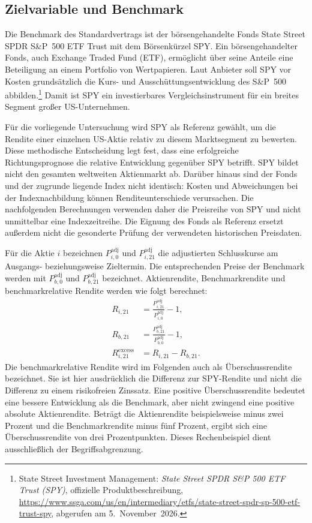 \subsection{Zielvariable und Benchmark}
Die Benchmark des Standardvertrags ist der börsengehandelte Fonds State Street SPDR S\&P~500 ETF Trust mit dem Börsenkürzel SPY. Ein börsengehandelter Fonds, auch Exchange Traded Fund (ETF), ermöglicht über seine Anteile eine Beteiligung an einem Portfolio von Wertpapieren. Laut Anbieter soll SPY vor Kosten grundsätzlich die Kurs- und Ausschüttungsentwicklung des S\&P~500 abbilden.\footnote{State Street Investment Management: \emph{State Street SPDR S\&P 500 ETF Trust (SPY)}, offizielle Produktbeschreibung, \url{https://www.ssga.com/us/en/intermediary/etfs/state-street-spdr-sp-500-etf-trust-spy}, abgerufen am 5.~November~2026.} Damit ist SPY ein investierbares Vergleichsinstrument für ein breites Segment großer US-Unternehmen.

Für die vorliegende Untersuchung wird SPY als Referenz gewählt, um die Rendite einer einzelnen US-Aktie relativ zu diesem Marktsegment zu bewerten. Diese methodische Entscheidung legt fest, dass eine erfolgreiche Richtungsprognose die relative Entwicklung gegenüber SPY betrifft. SPY bildet nicht den gesamten weltweiten Aktienmarkt ab. Darüber hinaus sind der Fonds und der zugrunde liegende Index nicht identisch: Kosten und Abweichungen bei der Indexnachbildung können Renditeunterschiede verursachen. Die nachfolgenden Berechnungen verwenden daher die Preisreihe von SPY und nicht unmittelbar eine Indexzeitreihe. Die Eignung des Fonds als Referenz ersetzt außerdem nicht die gesonderte Prüfung der verwendeten historischen Preisdaten.

Für die Aktie $i$ bezeichnen $P^{\mathrm{adj}}_{i,0}$ und $P^{\mathrm{adj}}_{i,21}$ die adjustierten Schlusskurse am Ausgangs- beziehungsweise Zieltermin. Die entsprechenden Preise der Benchmark werden mit $P^{\mathrm{adj}}_{b,0}$ und $P^{\mathrm{adj}}_{b,21}$ bezeichnet. Aktienrendite, Benchmarkrendite und benchmarkrelative Rendite werden wie folgt berechnet:
\begin{align}
 R_{i,21} &= \frac{P^{\mathrm{adj}}_{i,21}}{P^{\mathrm{adj}}_{i,0}}-1,
 \label{eq:ticker-return}\\
 R_{b,21} &= \frac{P^{\mathrm{adj}}_{b,21}}{P^{\mathrm{adj}}_{b,0}}-1,
 \label{eq:benchmark-return}\\
 R^{\mathrm{excess}}_{i,21} &= R_{i,21}-R_{b,21}.
 \label{eq:excess-return}
\end{align}
Die benchmarkrelative Rendite wird im Folgenden auch als Überschussrendite bezeichnet. Sie ist hier ausdrücklich die Differenz zur SPY-Rendite und nicht die Differenz zu einem risikofreien Zinssatz. Eine positive Überschussrendite bedeutet eine bessere Entwicklung als die Benchmark, aber nicht zwingend eine positive absolute Aktienrendite. Beträgt die Aktienrendite beispielsweise minus zwei Prozent und die Benchmarkrendite minus fünf Prozent, ergibt sich eine Überschussrendite von drei Prozentpunkten. Dieses Rechenbeispiel dient ausschließlich der Begriffsabgrenzung.

